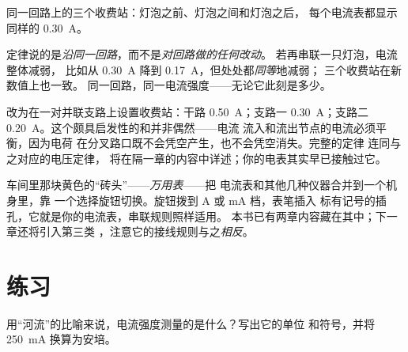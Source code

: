 \begin{omfigure}

{\small 同一回路上的三个收费站：灯泡之前、灯泡之间和灯泡之后，
每个电流表都显示同样的 \qty{0.30}{A}。}
\end{omfigure}

\begin{example}[读懂定律的细则]\label{ex:g8:intensity-ammeter:fineprint}
定律说的是\emph{沿同一回路}，而不是\emph{对回路做的任何改动}。
若再串联一只灯泡，电流整体减弱，
比如从 \qty{0.30}{A} 降到
\qty{0.17}{A}，但处处都\emph{同等}地减弱；
三个收费站在新数值上也一致。
同一回路，同一电流强度——无论它此刻是多少。
\end{example}

\begin{example}[一瞥节点]\label{ex:g8:intensity-ammeter:junction}
改为在一对并联支路上设置收费站：干路
\qty{0.50}{A}；支路一 \qty{0.30}{A}；支路二
\qty{0.20}{A}。这个颇具启发性的和并非偶然——电流
流入和流出节点的电流必须平衡，因为电荷
在分叉路口既不会凭空产生，也不会凭空消失。完整的定律
连同与之对应的电压定律，
将在隔一章的内容中详述；你的电表其实早已接触过它。
\end{example}

\begin{remark}[万用表]\label{rem:g8:intensity-ammeter:multimeter}
车间里那块黄色的“砖头”——\emph{万用表}——把
电流表和其他几种仪器合并到一个机身里，靠
一个选择旋钮切换。旋钮拨到 \unit{A} 或 \unit{mA} 档，表笔插入
标有记号的插孔，它就是你的电流表，串联规则照样适用。
本书已有两章内容藏在其中；下一章还将引入第三类
，注意它的接线规则与之\emph{相反}。
\end{remark}

\section{练习}

\begin{exercise}[$\star$]\label{exo:g8:intensity-ammeter:1}
用“河流”的比喻来说，电流强度测量的是什么？写出它的单位
和符号，并将 \qty{250}{mA} 换算为安培。
\end{exercise}

